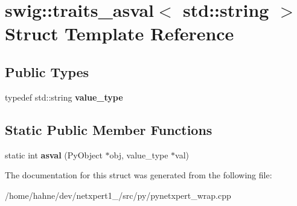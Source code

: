\hypertarget{structswig_1_1traits__asval_3_01std_1_1string_01_4}{}\section{swig\+:\+:traits\+\_\+asval$<$ std\+:\+:string $>$ Struct Template Reference}
\label{structswig_1_1traits__asval_3_01std_1_1string_01_4}
\subsection*{Public Types}
\begin{DoxyCompactItemize}
\item 
typedef std\+::string {\bfseries value\+\_\+type}\hypertarget{structswig_1_1traits__asval_3_01std_1_1string_01_4_a66eab9ad087e2527eb509f04e6e70d75}{}\label{structswig_1_1traits__asval_3_01std_1_1string_01_4_a66eab9ad087e2527eb509f04e6e70d75}

\end{DoxyCompactItemize}
\subsection*{Static Public Member Functions}
\begin{DoxyCompactItemize}
\item 
static int {\bfseries asval} (Py\+Object $\ast$obj, value\+\_\+type $\ast$val)\hypertarget{structswig_1_1traits__asval_3_01std_1_1string_01_4_a1b4d91079cc3870021fac8f5514404ff}{}\label{structswig_1_1traits__asval_3_01std_1_1string_01_4_a1b4d91079cc3870021fac8f5514404ff}

\end{DoxyCompactItemize}


The documentation for this struct was generated from the following file\+:\begin{DoxyCompactItemize}
\item 
/home/hahne/dev/netxpert1\+\_/src/py/pynetxpert\+\_\+wrap.\+cpp\end{DoxyCompactItemize}
